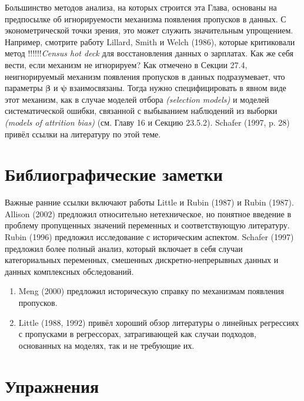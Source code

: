 Большинство методов анализа, на которых строится эта Глава, основаны на предпосылке об игнорируемости механизма появления пропусков в данных. С эконометрической точки зрения, это может служить значительным упрощением. Например, смотрите работу Lillard, Smith и Welch (1986), которые критиковали метод !!!!!!\emph{Census hot deck} для восстановления данных о зарплатах. Как же себя вести, если механизм не игнорируем? Как отмечено в Секции 27.4, неигнорируемый механизм появления пропусков в данных подразумевает, что параметры $\mathbf{\beta}$ и $\mathbf{\psi}$ взаимосвязаны. Тогда нужно специфицировать в явном виде этот механизм, как в случае моделей отбора \emph{(selection models)} и моделей систематической ошибки, связанной с выбыванием наблюдений из выборки \emph{(models of attrition bias)} (см. Главу 16 и Секцию 23.5.2). Schafer (1997, p. 28) привёл ссылки на литературу по этой теме.

\section{Библиографические заметки}
Важные ранние ссылки включают работы Little и Rubin (1987) и Rubin (1987). Allison (2002) предложил относительно нетехническое, но понятное введение в проблему пропущенных значений переменных и соответствующую литературу. Rubin (1996) предложил исследование с историческим аспектом. Schafer (1997) предложил более полный анализ, который включает в себя случаи категориальных переменных, смешенных дискретно-непрерывных данных и данных комплексных обследований.
\begin{enumerate}
\item Meng (2000) предложил историческую справку по механизмам появления пропусков.
\item Little (1988, 1992) привёл хороший обзор литературы о линейных регрессиях с пропусками в регрессорах, затрагивающей как случаи подходов, основанных на моделях, так и не требующие их.
\end{enumerate}

\section*{Упражнения} 

